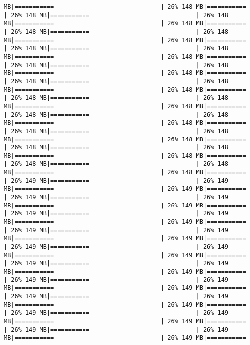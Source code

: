 \documentclass[
]{article}
\begin{document}
\begin{verbatim}
MB|===========                              | 26% 148 MB|===========                              | 26% 148 MB|===========                              | 26% 148 MB|===========                              | 26% 148 MB|===========                              | 26% 148 MB|===========                              | 26% 148 MB|===========                              | 26% 148 MB|===========                              | 26% 148 MB|===========                              | 26% 148 MB|===========                              | 26% 148 MB|===========                              | 26% 148 MB|===========                              | 26% 148 MB|===========                              | 26% 148 MB|===========                              | 26% 148 MB|===========                              | 26% 148 MB|===========                              | 26% 148 MB|===========                              | 26% 148 MB|===========                              | 26% 148 MB|===========                              | 26% 148 MB|===========                              | 26% 148 MB|===========                              | 26% 148 MB|===========                              | 26% 148 MB|===========                              | 26% 148 MB|===========                              | 26% 148 MB|===========                              | 26% 148 MB|===========                              | 26% 148 MB|===========                              | 26% 148 MB|===========                              | 26% 148 MB|===========                              | 26% 148 MB|===========                              | 26% 148 MB|===========                              | 26% 148 MB|===========                              | 26% 149 MB|===========                              | 26% 149 MB|===========                              | 26% 149 MB|===========                              | 26% 149 MB|===========                              | 26% 149 MB|===========                              | 26% 149 MB|===========                              | 26% 149 MB|===========                              | 26% 149 MB|===========                              | 26% 149 MB|===========                              | 26% 149 MB|===========                              | 26% 149 MB|===========                              | 26% 149 MB|===========                              | 26% 149 MB|===========                              | 26% 149 MB|===========                              | 26% 149 MB|===========                              | 26% 149 MB|===========                              | 26% 149 MB|===========                              | 26% 149 MB|===========                              | 26% 149 MB|===========                              | 26% 149 MB|===========                              | 26% 149 MB|===========                              | 26% 149 MB|===========                              | 26% 149 MB|===========                              | 26% 149 MB|===========                              | 26% 149 MB|===========                              | 26% 149 MB|===========                              | 26% 149 MB|===========                              | 26% 149 MB|===========                              | 26% 149 MB|===========                              | 26% 149 MB|===========           
\end{verbatim}
\end{document}
